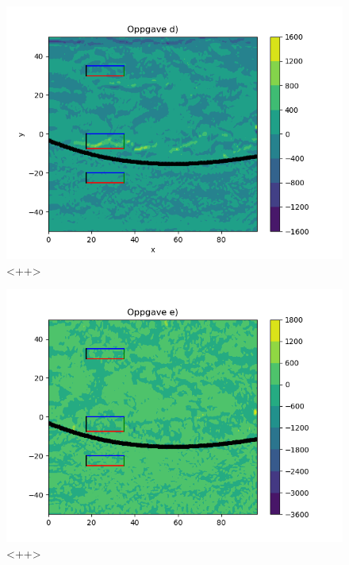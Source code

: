 \documentclass[a4paper,10pt,norsk]{article}
\begin{document}
	\begin{figure}[h!]
		\centering
		\caption{<++>}
		\label{fig:d}
		\includegraphics{oppgave_d.png}
	\end{figure}
	\begin{figure}[h!]
		\centering
		\caption{<++>}
		\label{fig:e}
		\includegraphics{oppgave_e.png}
	\end{figure}
		
\end{document}

